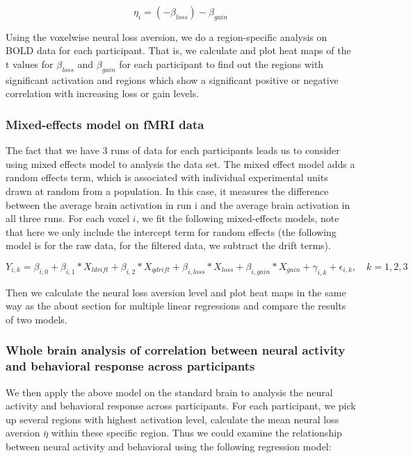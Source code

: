 \documentclass[11pt]{article}
\begin{document}
\begin{equation}
\eta_i = (-\beta_{loss}) - \beta_{gain}
\end{equation}

Using the voxelwise neural loss aversion, we do a region-specific analysis on 
BOLD data for each participant. That is, we calculate and plot heat maps of the t values
for $\beta_{loss}$ and $\beta_{gain}$ for each participant to find out the 
regions with significant activation and regions which show a significant 
positive or negative correlation with increasing loss or gain levels.

\subsubsection{Mixed-effects model on fMRI data}

The fact that we have 3 runs of data for each participants leads us to consider using mixed effects model to analysis the data set. The mixed effect model adds a random effects term, which is associated with individual experimental units drawn at random from a population. In this case, it measures the difference between the average brain activation in run i and the 
average brain activation in all three runs. For each voxel $i$, we fit the following mixed-effects models, note that here we only include the intercept term for random effects (the following model is for the raw data, for the filtered data, we subtract the drift terms).

\begin{equation}
Y_{i, k} = \beta_{i, 0} + \beta_{i,1} *X_{ldrift} + \beta_{i, 2} * X_{qdrift} +  \beta_{i, loss} *X_{loss} + \beta_{i, gain} * X_{gain}  + \gamma _{i, k} + \epsilon_{i, k}, \quad k =1, 2, 3
\end{equation}

Then we calculate the neural loss aversion level and plot heat maps in the same way as the about section for multiple linear regressions and compare the results of two models. 

\subsubsection{Whole brain analysis of correlation between 
neural activity and behavioral response across participants}

We then apply the above model on the standard brain to analysis the neural 
activity and behavioral response across participants. For each participant, 
we pick up several regions with highest activation level, calculate the mean 
neural loss aversion $\bar{\eta}$ within these specific region. Thus we could 
examine the relationship between neural activity and behavioral using the 
following regression model:
\end{document}
